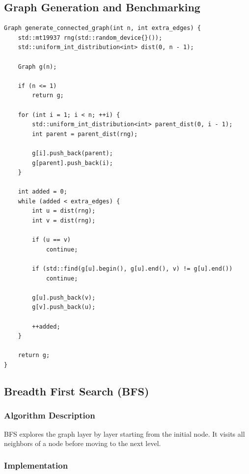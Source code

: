 \documentclass[12pt]{article}
\begin{document}
\subsection{Graph Generation and Benchmarking}

\begin{lstlisting}
Graph generate_connected_graph(int n, int extra_edges) {
    std::mt19937 rng(std::random_device{}());
    std::uniform_int_distribution<int> dist(0, n - 1);

    Graph g(n);

    if (n <= 1)
        return g;

    for (int i = 1; i < n; ++i) {
        std::uniform_int_distribution<int> parent_dist(0, i - 1);
        int parent = parent_dist(rng);

        g[i].push_back(parent);
        g[parent].push_back(i);
    }

    int added = 0;
    while (added < extra_edges) {
        int u = dist(rng);
        int v = dist(rng);

        if (u == v)
            continue;

        if (std::find(g[u].begin(), g[u].end(), v) != g[u].end())
            continue;

        g[u].push_back(v);
        g[v].push_back(u);

        ++added;
    }

    return g;
}
\end{lstlisting}

\subsection{Breadth First Search (BFS)}

\subsubsection*{Algorithm Description}

BFS explores the graph layer by layer starting from the initial node. It visits all neighbors of a node before moving to the next level.

\subsubsection*{Implementation}
\end{document}
